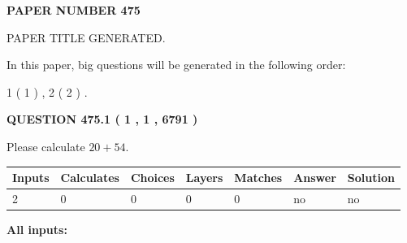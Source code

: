 \documentclass[12pt]{article}
\begin{document}
   
   
   
\newpage 
\setcounter{page}{ 
   475001 } 
   
   
   
   
 {\textbf{ \Large{ PAPER NUMBER  475  }}}
   
   
\vspace{0.2in}
   
   
   
   
   
   
   
   
 \vspace{0.2in}
 
 
 
 
   
   
 PAPER TITLE GENERATED.
   
   
   
\vspace{0.2in}
   
In this paper, big questions will be generated in the following order: 
   
   
   1 ( 1 )
 ,
   2 ( 2 )
 .
  
\vspace{0.2in}
  
{\textbf{\Large{QUESTION
475.1 
 ( 1 , 1 , 6791 )
}}}
  
  
 
Please calculate $ %
20 +  %
54 $.
 
 
   
   
   
   
\noindent\begin{tabular}{|l|l|l|l|l|l|l|}
 \hline
Inputs & Calculates & Choices & Layers & Matches & Answer & Solution \\ \hline
 2  & 
 0  & 
 0
  & 
 0  & 
 0  & 
  no & 
  no 
  \\ \hline
 \end{tabular}
   
   
   
   
\noindent{}
   
   
   
   
\noindent\vspace{0.1in}\hspace{-0.08in} {\textbf{\Large{All inputs: }}}
   
   
  
\end{document}
